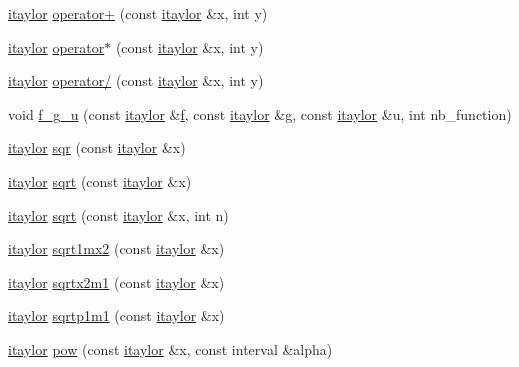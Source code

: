 \begin{DoxyCompactItemize}
\hyperlink{classtaylor_1_1itaylor}{itaylor} \hyperlink{namespacetaylor_ad7810135b75df4525eeaa320940436d3}{operator+} (const \hyperlink{classtaylor_1_1itaylor}{itaylor} \&x, int y)
\item 
\hyperlink{classtaylor_1_1itaylor}{itaylor} \hyperlink{namespacetaylor_aabf6fb8b1928b06ac73dfc55bee2e993}{operator$\ast$} (const \hyperlink{classtaylor_1_1itaylor}{itaylor} \&x, int y)
\item 
\hyperlink{classtaylor_1_1itaylor}{itaylor} \hyperlink{namespacetaylor_a770113818b5fc83f7eefe876cbdd8295}{operator/} (const \hyperlink{classtaylor_1_1itaylor}{itaylor} \&x, int y)
\item 
void \hyperlink{namespacetaylor_a9962829203c2ce858b9158543d577e0d}{f\-\_\-g\-\_\-u} (const \hyperlink{classtaylor_1_1itaylor}{itaylor} \&\hyperlink{errorfunc_8hpp_aacb77b1211a6ca2e2beff1811cf9ecf4}{f}, const \hyperlink{classtaylor_1_1itaylor}{itaylor} \&g, const \hyperlink{classtaylor_1_1itaylor}{itaylor} \&u, int nb\-\_\-function)
\item 
\hyperlink{classtaylor_1_1itaylor}{itaylor} \hyperlink{namespacetaylor_a37319bcf4ecec3b74d87c39c9b5a8fce}{sqr} (const \hyperlink{classtaylor_1_1itaylor}{itaylor} \&x)
\item 
\hyperlink{classtaylor_1_1itaylor}{itaylor} \hyperlink{namespacetaylor_a5a055d2fa829aab1ef9d9d452dbf635b}{sqrt} (const \hyperlink{classtaylor_1_1itaylor}{itaylor} \&x)
\item 
\hyperlink{classtaylor_1_1itaylor}{itaylor} \hyperlink{namespacetaylor_af9650236965b00326a3be8175c47789c}{sqrt} (const \hyperlink{classtaylor_1_1itaylor}{itaylor} \&x, int n)
\item 
\hyperlink{classtaylor_1_1itaylor}{itaylor} \hyperlink{namespacetaylor_a282c010c1d5e11c9363b21a788e9b1d5}{sqrt1mx2} (const \hyperlink{classtaylor_1_1itaylor}{itaylor} \&x)
\item 
\hyperlink{classtaylor_1_1itaylor}{itaylor} \hyperlink{namespacetaylor_a72536b0978e6cdcec6adf898e2642d31}{sqrtx2m1} (const \hyperlink{classtaylor_1_1itaylor}{itaylor} \&x)
\item 
\hyperlink{classtaylor_1_1itaylor}{itaylor} \hyperlink{namespacetaylor_a8a7b5c467bf63f6e51bd5b6c55ddd74d}{sqrtp1m1} (const \hyperlink{classtaylor_1_1itaylor}{itaylor} \&x)
\item 
\hyperlink{classtaylor_1_1itaylor}{itaylor} \hyperlink{namespacetaylor_a585467c43fcacacb16fcfa01320f4a15}{pow} (const \hyperlink{classtaylor_1_1itaylor}{itaylor} \&x, const interval \&alpha)
\item 

\end{DoxyCompactItemize}
